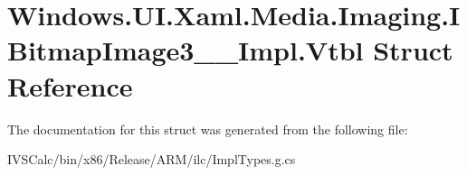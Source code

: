 \hypertarget{struct_windows_1_1_u_i_1_1_xaml_1_1_media_1_1_imaging_1_1_i_bitmap_image3_____impl_1_1_vtbl}{}\section{Windows.\+U\+I.\+Xaml.\+Media.\+Imaging.\+I\+Bitmap\+Image3\+\_\+\+\_\+\+Impl.\+Vtbl Struct Reference}
\label{struct_windows_1_1_u_i_1_1_xaml_1_1_media_1_1_imaging_1_1_i_bitmap_image3_____impl_1_1_vtbl}


The documentation for this struct was generated from the following file\+:\begin{DoxyCompactItemize}
\item 
I\+V\+S\+Calc/bin/x86/\+Release/\+A\+R\+M/ilc/Impl\+Types.\+g.\+cs\end{DoxyCompactItemize}
